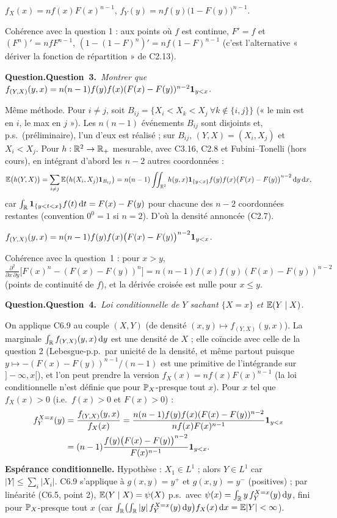 \documentclass[11pt,a4paper]{article}
\newcommand{\question}[2]{\par\medskip\noindent\textbf{\ifx\relax#1\relax Question.\else Question~#1.\fi}~\textit{#2}\par\smallskip}
\begin{document}
\begin{exo}
\begin{resultat}
$f_X(x)=nf(x)F(x)^{n-1}$, \qquad $f_Y(y)=nf(y)\bigl(1-F(y)\bigr)^{n-1}$.
\end{resultat}
Cohérence avec la question 1 : aux points où $f$ est continue, $F'=f$ et $(F^n)'=nfF^{n-1}$, $(1-(1-F)^n)'=nf(1-F)^{n-1}$
(c'est l'alternative « dériver la fonction de répartition » de C2.13).

\question{3}{Montrer que $f_{(Y,X)}(y,x)=n(n-1)f(y)f(x)(F(x)-F(y))^{n-2}\mathbf{1}_{y<x}$.}

Même méthode. Pour $i\ne j$, soit $B_{ij}=\{X_i<X_k<X_j\ \forall k\notin\{i,j\}\}$ (« le min est en $i$, le max en $j$ »). Les $n(n-1)$
événements $B_{ij}$ sont disjoints et, p.s.\ (préliminaire), l'un d'eux est réalisé ; sur $B_{ij}$, $(Y,X)=(X_i,X_j)$ et $X_i<X_j$. Pour
$h:\mathbb{R}^2\to\mathbb{R}_+$ mesurable, avec C3.16, C2.8 et Fubini--Tonelli (hors cours), en intégrant d'abord les $n-2$ autres coordonnées :
\[\mathbb{E}\bigl(h(Y,X)\bigr)=\sum_{i\ne j}\mathbb{E}\bigl(h(X_i,X_j)\mathbf{1}_{B_{ij}}\bigr)
=n(n-1)\iint_{\mathbb{R}^2}h(y,x)\mathbf{1}_{\{y<x\}}f(y)f(x)\bigl(F(x)-F(y)\bigr)^{n-2}\,\mathrm{d} y\,\mathrm{d} x,\]
car $\int_{\mathbb{R}}\mathbf{1}_{\{y<t<x\}}f(t)\,\mathrm{d} t=F(x)-F(y)$ pour chacune des $n-2$ coordonnées restantes (convention $0^0=1$ si $n=2$). D'où la densité
annoncée (C2.7).

\begin{resultat}
$f_{(Y,X)}(y,x)=n(n-1)f(y)f(x)\bigl(F(x)-F(y)\bigr)^{n-2}\mathbf{1}_{y<x}$.
\end{resultat}
Cohérence avec la question~1 : pour $x>y$, $\frac{\partial^2}{\partial x\,\partial y}\bigl[F(x)^n-(F(x)-F(y))^n\bigr]=n(n-1)f(x)f(y)(F(x)-F(y))^{n-2}$
(points de continuité de $f$), et la dérivée croisée est nulle pour $x\le y$.

\question{4}{Loi conditionnelle de $Y$ sachant $\{X=x\}$ et $\mathbb{E}(Y\mid X)$.}

On applique C6.9 au couple $(X,Y)$ (de densité $(x,y)\mapsto f_{(Y,X)}(y,x)$). La marginale $\int_{\mathbb{R}} f_{(Y,X)}(y,x)\,\mathrm{d} y$ est une densité de $X$ ;
elle coïncide avec celle de la question 2 (Lebesgue-p.p.\ par unicité de la densité, et même partout puisque $y\mapsto-(F(x)-F(y))^{n-1}/(n-1)$ est une primitive de l'intégrande sur $]-\infty,x[$), et l'on peut prendre la version $f_X(x)=nf(x)F(x)^{n-1}$ (la loi
conditionnelle n'est définie que pour $\mathbb{P}_X$-presque tout $x$). Pour $x$ tel que $f_X(x)>0$ (i.e.\ $f(x)>0$ et $F(x)>0$) :
\begin{align*}f_Y^{X=x}(y)&=\frac{f_{(Y,X)}(y,x)}{f_X(x)}=\frac{n(n-1)f(y)f(x)(F(x)-F(y))^{n-2}}{nf(x)F(x)^{n-1}}\mathbf{1}_{y<x}\\
&=(n-1)\frac{f(y)\bigl(F(x)-F(y)\bigr)^{n-2}}{F(x)^{n-1}}\mathbf{1}_{y<x}.\end{align*}
\textbf{Espérance conditionnelle.} Hypothèse : $X_1\in L^1$ ; alors $Y\in L^1$ car $|Y|\le\sum_i|X_i|$. C6.9 s'applique à $g(x,y)=y^+$
et $g(x,y)=y^-$ (positives) ; par linéarité (C6.5, point 2), $\mathbb{E}(Y\mid X)=\psi(X)$ p.s.\ avec
$\psi(x)=\int_{\mathbb{R}} y\,f_Y^{X=x}(y)\,\mathrm{d} y$, fini pour $\mathbb{P}_X$-presque tout $x$ (car $\int_{\mathbb{R}}\bigl(\int_{\mathbb{R}}|y|\,f_Y^{X=x}(y)\,\mathrm{d} y\bigr)f_X(x)\,\mathrm{d} x=\mathbb{E}|Y|<\infty$).


\end{exo}
\end{document}
